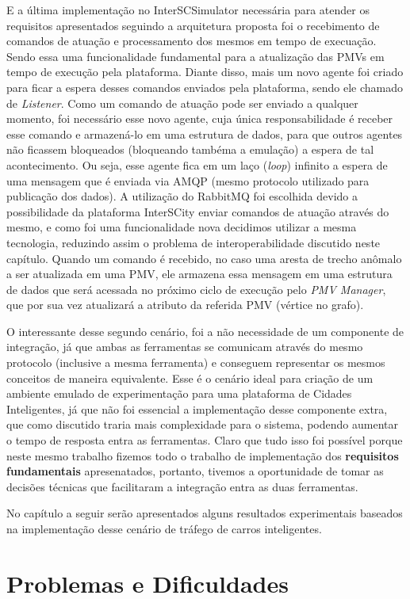 E a última implementação no InterSCSimulator necessária para atender os requisitos apresentados seguindo a arquitetura proposta foi o recebimento de comandos de atuação e
processamento dos mesmos em tempo de execuação.
Sendo essa uma funcionalidade fundamental para a atualização das PMVs em tempo de execução pela plataforma.
Diante disso, mais um novo agente foi criado para ficar a espera desses comandos enviados pela plataforma, sendo ele chamado de \textit{Listener}.
Como um comando de atuação pode ser enviado a qualquer momento, foi necessário esse novo agente, cuja única responsabilidade é receber esse comando e armazená-lo em uma
estrutura de dados, para que outros agentes não ficassem bloqueados (bloqueando tambéma a emulação) a espera de tal acontecimento.
Ou seja, esse agente fica em um laço (\textit{loop}) infinito a espera de uma mensagem que é enviada via AMQP (mesmo protocolo utilizado para publicação dos dados).
A utilização do RabbitMQ foi escolhida devido a possibilidade da plataforma InterSCity enviar comandos de atuação através do mesmo, e como foi uma funcionalidade nova
decidimos utilizar a mesma tecnologia, reduzindo assim o problema de interoperabilidade discutido neste capítulo.
Quando um comando é recebido, no caso uma aresta de trecho anômalo a ser atualizada em uma PMV, ele armazena essa mensagem em uma estrutura de dados que será acessada no
próximo ciclo de execução pelo \textit{PMV Manager}, que por sua vez atualizará a atributo da referida PMV (vértice no grafo).

O interessante desse segundo cenário, foi a não necessidade de um componente de integração, já que ambas as ferramentas se comunicam através do mesmo protocolo (inclusive a
mesma ferramenta) e conseguem representar os mesmos conceitos de maneira equivalente.
Esse é o cenário ideal para criação de um ambiente emulado de experimentação para uma plataforma de Cidades Inteligentes, já que não foi essencial a implementação desse
componente extra, que como discutido traria mais complexidade para o sistema, podendo aumentar o tempo de resposta entra as ferramentas.
Claro que tudo isso foi possível porque neste mesmo trabalho fizemos todo o trabalho de implementação dos \textbf{requisitos fundamentais} apresenatados, portanto,
tivemos a oportunidade de tomar as decisões técnicas que facilitaram a integração entra as duas ferramentas.

No capítulo a seguir serão apresentados alguns resultados experimentais baseados na implementação desse cenário de tráfego de carros inteligentes.

\section{Problemas e Dificuldades}
